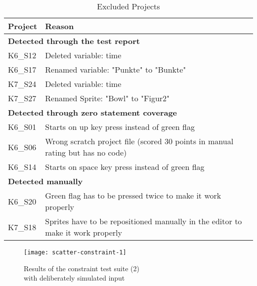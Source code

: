 \begin{table}
    \centering
    \scriptsize
    \begin{tabular}{ll}
        \toprule
        Project & Reason                                                                          \\
        \midrule
        \multicolumn{2}{l}{\textbf{Detected through the test report}}                             \\
        K6\_S12 & Deleted variable: time                                                          \\
        K6\_S17 & Renamed variable: "Punkte" to "Bunkte"                                          \\
        K7\_S24 & Deleted variable: time                                                          \\
        K7\_S27 & Renamed Sprite: "Bowl" to "Figur2"                                              \\[\medskipamount]

        \multicolumn{2}{l}{\textbf{Detected through zero statement coverage}}                     \\
        K6\_S01 & Starts on up key press instead of green flag                                    \\
        K6\_S06 & Wrong scratch project file (scored 30 points in manual rating but has no code)  \\
        K6\_S14 & Starts on space key press instead of green flag                                 \\[\medskipamount]

        \multicolumn{2}{l}{\textbf{Detected manually}}                                            \\
        K6\_S20 & Green flag has to be pressed twice to make it work properly                     \\
        K7\_S18 & Sprites have to be repositioned manually in the editor to make it work properly \\
        \bottomrule
    \end{tabular}
    \caption{Excluded Projects}
    \label{tab:excluded_projects}
\end{table}

\begin{figure}
    \centering
    \texttt{[image: scatter-constraint-1]}
    \caption{Results of the constraint test suite (2) \\ with deliberately simulated input}
    \label{fig:scatter_constraint_1}
\end{figure}

